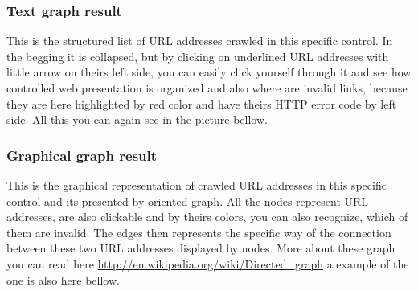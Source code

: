 \documentclass[12pt,a4paper]{article}
\begin{document}
\subsubsection{Text graph result} \label{text}
This is the structured list of URL addresses crawled in this specific control. In the begging it is collapsed, but by clicking on underlined URL addresses with little arrow on theirs left side, you can easily click yourself through it and see how controlled web presentation is organized and also where are invalid links, because they are here highlighted by red color and have theirs HTTP error code by left side. All this you can again see in the picture bellow.
\subsubsection{Graphical graph result} \label{graphical}
This is the graphical representation of crawled URL addresses in this specific control and its presented by oriented graph. All the nodes represent URL addresses, are also clickable and by theirs colors, you can also recognize, which of them are invalid. The edges then represents the specific way of the connection between these two URL addresses displayed by nodes. More about these graph you can read here \url{http://en.wikipedia.org/wiki/Directed_graph} a example of the one is also here bellow.
\end{document}
